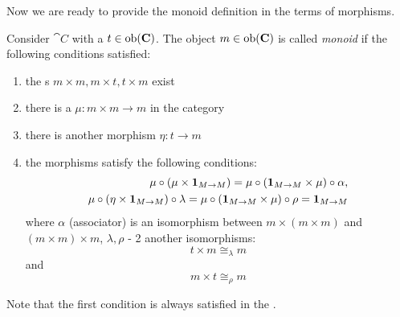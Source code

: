 Now we are ready to provide the monoid definition in the terms of morphisms.
\begin{definition}[Monoid]
\label{def:monoid_category}
Consider  $\cat{C}$ with a
 $t \in \mathrm{ob}(\mathbf{C})$. 
The object $m \in
\mathrm{ob}(\mathbf{C})$ is called \textit{monoid} if the following
conditions satisfied:
\begin{enumerate}
\item the s $m \times m, m \times t, t \times
  m$ exist 
\item there is a  $\mu: m \times m \to m$ in
  the category
\item there is another morphism $\eta: t \to m$
\item the morphisms satisfy the following conditions:
\begin{eqnarray}
\mu\circ\left(\mu \times
    \mathbf{1}_{ M \to M }\right) = \mu \circ \left(\mathbf{1}_{ M \to M } \times \mu\right) \circ
    \alpha,
\nonumber \\
\mu \circ (\eta \times \mathbf{1}_{ M \to M })
\circ \lambda = \mu \circ (\mathbf{1}_{ M \to M } \times \mu) \circ \rho =
\mathbf{1}_{ M \to M }
\nonumber
\end{eqnarray}
where $\alpha$ (associator) is an isomorphism between $m \times (m
\times m)$ and $(m \times m) \times m$, $\lambda, \rho$ - 2 another
isomorphisms: 
\[
t \times m \cong_\lambda m
\]
and
\[
m \times t \cong_\rho m
\]
\end{enumerate}
Note that the first condition is always satisfied in the
. 
\end{definition}

